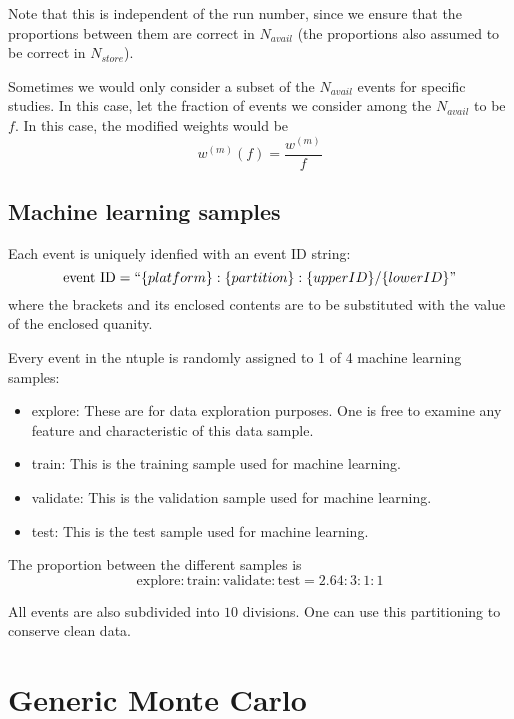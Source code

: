 \documentclass{article}
\renewcommand{\(}{\left(}
\renewcommand{\)}{\right)}
\numberwithin{equation}{section}
\begin{document}
Note that this is independent of the run number, since we ensure that the proportions between them are correct in $N_{avail}$ (the proportions also assumed to be correct in $N_{store}$).

Sometimes we would only consider a subset of the $N_{avail}$ events for specific studies. In this case, let the fraction of events we consider among the $N_{avail}$ to be $f$. In this case, the modified weights would be 
\begin{equation}
  w^{(m)}(f) = \frac{w^{(m)}}{f}
\end{equation}

\subsection{Machine learning samples}
Each event is uniquely idenfied with an event ID string:
\begin{equation}
  \text{event ID} = ``\{platform\}:\{partition\}:\{upperID\}/\{lowerID\}"
\end{equation}
where the brackets and its enclosed contents are to be substituted with the value of the enclosed quanity.

Every event in the ntuple is randomly assigned to 1 of 4 machine learning samples:
\begin{itemize}
  \item explore: These are for data exploration purposes. One is free to examine any feature and characteristic of this data sample. 
  \item train: This is the training sample used for machine learning. 
  \item validate: This is the validation sample used for machine learning. 
  \item test: This is the test sample used for machine learning. 
\end{itemize}

The proportion between the different samples is 
\begin{equation}
  \text{explore}:\text{train}:\text{validate}:\text{test}=2.64 : 3 : 1 : 1
\end{equation}

All events are also subdivided into $10$ divisions. One can use this partitioning to conserve clean data.

\newpage

\section{Generic Monte Carlo}
\end{document}
